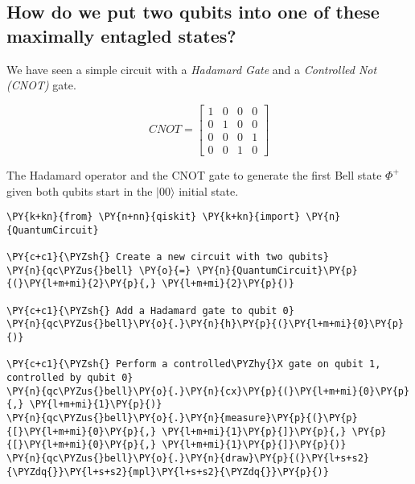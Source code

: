     \hypertarget{how-do-we-put-two-qubits-into-one-of-these-maximally-entagled-states}{%
\subsection*{How do we put two qubits into one of these maximally
entagled
states?}\label{how-do-we-put-two-qubits-into-one-of-these-maximally-entagled-states}}

We have seen a simple circuit with a \emph{Hadamard Gate} and a
\emph{Controlled Not (CNOT)} gate.

\[
CNOT = \begin{bmatrix} 1 & 0 & 0 & 0 \\ 0 & 1 & 0 & 0 \\ 0 & 0 & 0 & 1 \\ 0 & 0  & 1 & 0 \end{bmatrix}
\]

The Hadamard operator and the CNOT gate to generate the first Bell state
\(\Phi^+\) given both qubits start in the \(\lvert 00\rangle\) initial
state.

    \begin{tcolorbox}[breakable, size=fbox, boxrule=1pt, pad at break*=1mm,colback=cellbackground, colframe=cellborder]
\begin{Verbatim}[commandchars=\\\{\}]
\PY{k+kn}{from} \PY{n+nn}{qiskit} \PY{k+kn}{import} \PY{n}{QuantumCircuit}

\PY{c+c1}{\PYZsh{} Create a new circuit with two qubits}
\PY{n}{qc\PYZus{}bell} \PY{o}{=} \PY{n}{QuantumCircuit}\PY{p}{(}\PY{l+m+mi}{2}\PY{p}{,} \PY{l+m+mi}{2}\PY{p}{)}
 
\PY{c+c1}{\PYZsh{} Add a Hadamard gate to qubit 0}
\PY{n}{qc\PYZus{}bell}\PY{o}{.}\PY{n}{h}\PY{p}{(}\PY{l+m+mi}{0}\PY{p}{)}
 
\PY{c+c1}{\PYZsh{} Perform a controlled\PYZhy{}X gate on qubit 1, controlled by qubit 0}
\PY{n}{qc\PYZus{}bell}\PY{o}{.}\PY{n}{cx}\PY{p}{(}\PY{l+m+mi}{0}\PY{p}{,} \PY{l+m+mi}{1}\PY{p}{)}
\PY{n}{qc\PYZus{}bell}\PY{o}{.}\PY{n}{measure}\PY{p}{(}\PY{p}{[}\PY{l+m+mi}{0}\PY{p}{,} \PY{l+m+mi}{1}\PY{p}{]}\PY{p}{,} \PY{p}{[}\PY{l+m+mi}{0}\PY{p}{,} \PY{l+m+mi}{1}\PY{p}{]}\PY{p}{)}
\PY{n}{qc\PYZus{}bell}\PY{o}{.}\PY{n}{draw}\PY{p}{(}\PY{l+s+s2}{\PYZdq{}}\PY{l+s+s2}{mpl}\PY{l+s+s2}{\PYZdq{}}\PY{p}{)}
\end{Verbatim}
\end{tcolorbox}
 
            
    
